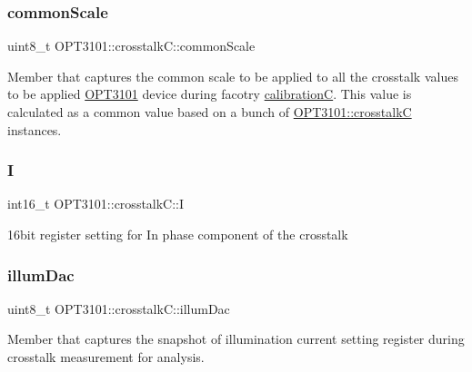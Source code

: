 \subsubsection{\texorpdfstring{common\+Scale}{commonScale}}
{\footnotesize\ttfamily uint8\+\_\+t O\+P\+T3101\+::crosstalk\+C\+::common\+Scale}



Member that captures the common scale to be applied to all the crosstalk values to be applied \mbox{\hyperlink{namespace_o_p_t3101}{O\+P\+T3101}} device during facotry \mbox{\hyperlink{class_o_p_t3101_1_1calibration_c}{calibrationC}}. This value is calculated as a common value based on a bunch of \mbox{\hyperlink{class_o_p_t3101_1_1crosstalk_c}{O\+P\+T3101\+::crosstalkC}} instances. 

\mbox{\label{class_o_p_t3101_1_1crosstalk_c_a97152b209288a0dc30c4158fdc1815fc}} 
\subsubsection{\texorpdfstring{I}{I}}
{\footnotesize\ttfamily int16\+\_\+t O\+P\+T3101\+::crosstalk\+C\+::I}



16bit register setting for In phase component of the crosstalk 

\mbox{\label{class_o_p_t3101_1_1crosstalk_c_a926366d3812a768269de408d4205bdec}} 
\subsubsection{\texorpdfstring{illum\+Dac}{illumDac}}
{\footnotesize\ttfamily uint8\+\_\+t O\+P\+T3101\+::crosstalk\+C\+::illum\+Dac}



Member that captures the snapshot of illumination current setting register during crosstalk measurement for analysis. 

\mbox{\label{class_o_p_t3101_1_1crosstalk_c_aa25494ff4a32e26e0abfa158b2e60808}} 
